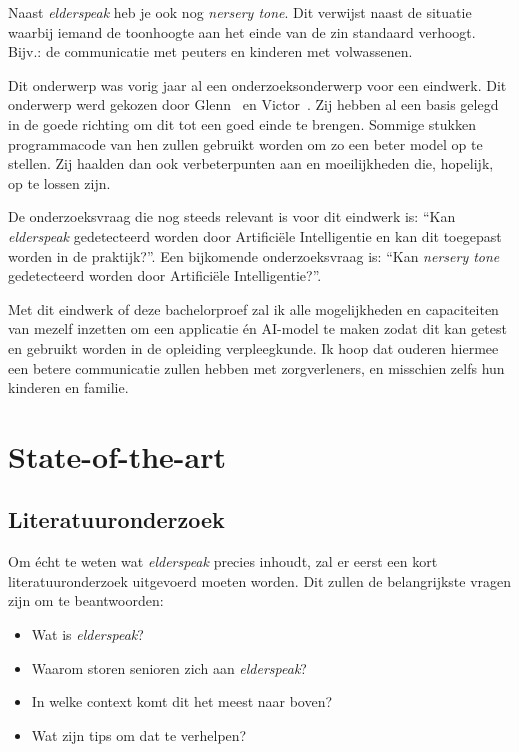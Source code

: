 Naast \textit{elderspeak} heb je ook nog \textit{nersery tone}. Dit verwijst naast de situatie waarbij iemand de toonhoogte aan het einde van de zin standaard verhoogt. Bijv.: de communicatie met peuters en kinderen met volwassenen.

Dit onderwerp was vorig jaar al een onderzoeksonderwerp voor een eindwerk.
Dit onderwerp werd gekozen door Glenn~\textcite{Beeckman2021} en Victor~\textcite{Standaert2021}.
Zij hebben al een basis gelegd in de goede richting om dit tot een goed einde te brengen.
Sommige stukken programmacode van hen zullen gebruikt worden om zo een beter model op te stellen.
Zij haalden dan ook verbeterpunten aan en moeilijkheden die, hopelijk, op te lossen zijn.

De onderzoeksvraag die nog steeds relevant is voor dit eindwerk is: ``Kan \textit{elderspeak} gedetecteerd worden door Artificiële Intelligentie en kan dit toegepast worden in de praktijk?''. Een bijkomende onderzoeksvraag is: ``Kan \textit{nersery tone} gedetecteerd worden door Artificiële Intelligentie?''.

Met dit eindwerk of deze bachelorproef zal ik alle mogelijkheden en capaciteiten van mezelf inzetten om een applicatie én AI-model te maken zodat dit kan getest en gebruikt worden in de opleiding verpleegkunde.
Ik hoop dat ouderen hiermee een betere communicatie zullen hebben met zorgverleners, en misschien zelfs hun kinderen en familie.



\section{State-of-the-art}
\label{sec:state-of-the-art}

\subsection{Literatuuronderzoek}\label{subsec:literatuuronderzoek}

Om écht te weten wat \textit{elderspeak} precies inhoudt, zal er eerst een kort literatuuronderzoek uitgevoerd moeten worden.
Dit zullen de belangrijkste vragen zijn om te beantwoorden:
\begin{itemize}
	\item Wat is \textit{elderspeak}?
	\item Waarom storen senioren zich aan \textit{elderspeak}?
	\item In welke context komt dit het meest naar boven?
	\item Wat zijn tips om dat te verhelpen?
\end{itemize}

